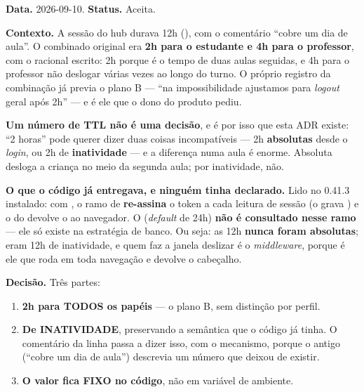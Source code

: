 \textbf{Data.} 2026-09-10. \textbf{Status.} Aceita.

\textbf{Contexto.} A sessão do hub durava 12h
(), com o comentário \enquote{cobre um dia de aula}.
O combinado original era \textbf{2h para o estudante e 4h para o professor},
com o racional escrito: 2h porque é o tempo de duas aulas seguidas, e 4h para
o professor não deslogar várias vezes ao longo do turno. O próprio registro da
combinação já previa o plano B --- \enquote{na impossibilidade ajustamos para
\emph{logout} geral após 2h} --- e é ele que o dono do produto pediu.

\textbf{Um número de TTL não é uma decisão}, e é por isso que esta ADR existe:
\enquote{2 horas} pode querer dizer duas coisas incompatíveis --- 2h
\textbf{absolutas} desde o \emph{login}, ou 2h de \textbf{inatividade} --- e a
diferença numa aula é enorme. Absoluta desloga a criança no meio da segunda
aula; por inatividade, não.

\textbf{O que o código já entregava, e ninguém tinha declarado.} Lido no
 0.41.3 instalado: com , o ramo  de
 \textbf{re-assina} o token a cada leitura de
sessão (o  grava ) e o 
do  devolve o  ao navegador. O 
(\emph{default} de 24h) \textbf{não é consultado nesse ramo} --- ele só existe
na estratégia de banco. Ou seja: as 12h \textbf{nunca foram absolutas}; eram
12h de inatividade, e quem faz a janela deslizar é o \emph{middleware}, porque
é ele que roda em toda navegação e devolve o cabeçalho.

\textbf{Decisão.} Três partes:

\begin{enumerate}
  \item \textbf{2h para TODOS os papéis} --- o plano B, sem distinção por
    perfil.
  \item \textbf{De INATIVIDADE}, preservando a semântica que o código já tinha.
    O comentário da linha passa a dizer isso, com o mecanismo, porque o antigo
    (\enquote{cobre um dia de aula}) descrevia um número que deixou de existir.
  \item \textbf{O valor fica FIXO no código}, não em variável de ambiente.
\end{enumerate}

